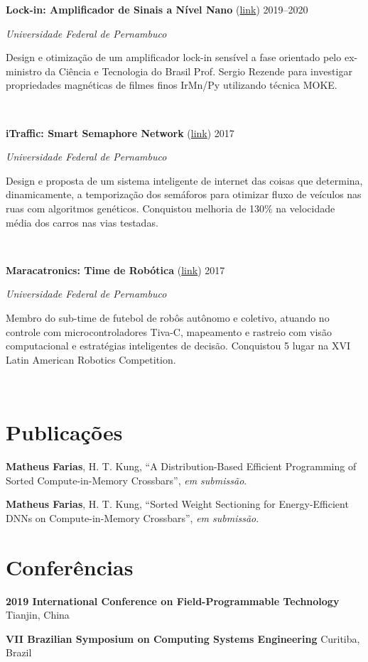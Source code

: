 \documentclass[letterpaper,10pt]{article}
\newcommand{\entry}[4]{

\begin{minipage}[t]{.15\textwidth}
\end{minipage}
\hfill\vline\hfill 
\begin{minipage}[t]{0.95\textwidth}
#2 \hfill \textsc{#1}

\textit{#3}

\footnotesize{#4}
\end{minipage}\\\vspace{.25cm}}
\newcommand{\ufpe}{Universidade Federal de Pernambuco}
\newcommand{\co}{\textcolor{crimson}{*}}
\begin{document}
\entry{2019--2020}{\textbf{Lock-in: Amplificador de Sinais a Nível Nano} (\href{https://www.matheussfarias.com/lockin.html}{link})}{\ufpe}{
	Design e otimização de um amplificador lock-in sensível a fase orientado pelo ex-ministro da Ciência e Tecnologia do Brasil Prof. Sergio Rezende para investigar propriedades magnéticas de filmes finos IrMn/Py utilizando técnica MOKE.
}

\entry{2017}{\textbf{iTraffic: Smart Semaphore Network} (\href{https://www.matheussfarias.com/itraffic.html}{link})}{\ufpe}{
	Design e proposta de um sistema inteligente de internet das coisas que determina, dinamicamente, a temporização dos semáforos para otimizar fluxo de veículos nas ruas com algoritmos genéticos. Conquistou melhoria de 130\% na velocidade média dos carros nas vias testadas.
}

\entry{2017}{\textbf{Maracatronics: Time de Robótica} (\href{https://www.matheussfarias.com/maracatronics.html}{link})}{\ufpe}{
	Membro do sub-time de futebol de robôs autônomo e coletivo, atuando no controle com microcontroladores Tiva-C, mapeamento e rastreio com visão computacional e estratégias inteligentes de decisão. Conquistou 5 lugar na XVI Latin American Robotics Competition.
}

\vspace*{-.25cm}

\section{Publicações}
\vspace*{.1cm}
\begin{etaremune}
	\renewcommand{\labelenumi}{[\theenumi]}
    \item \textbf{Matheus Farias}, H. T. Kung, ``A Distribution-Based Efficient Programming of Sorted Compute-in-Memory Crossbars'', \textit{em submissão}.
    \item \textbf{Matheus Farias}, H. T. Kung, ``Sorted Weight Sectioning for Energy-Efficient DNNs on Compute-in-Memory Crossbars'', \textit{em submissão}.
\end{etaremune}
\vspace*{-.25cm}

\section{Conferências}
\vspace*{.1cm}
\begin{etaremune}
	\item \textbf{2019 International Conference on Field-Programmable Technology}
	\hfill{Tianjin, China}
	\item \textbf{VII Brazilian Symposium on Computing Systems Engineering}
	\hfill{Curitiba, Brazil}
	\end{etaremune}
\end{document}
